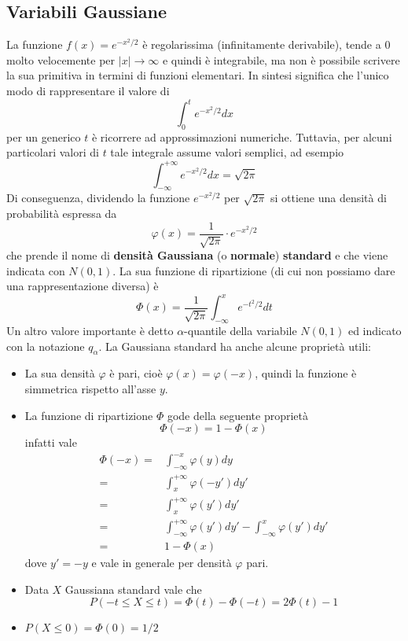 \subsection{Variabili Gaussiane}
La funzione $f(x) = e^{-x^2 / 2}$ è regolarissima (infinitamente derivabile), tende a 0 molto
velocemente per $|x| \to \infty$ e quindi è integrabile, ma non è possibile scrivere la sua
primitiva in termini di funzioni elementari. In sintesi significa che l'unico modo di rappresentare
il valore di
\[ \int_0^t e^{-x^2 / 2} dx \]
per un generico $t$ è ricorrere ad approssimazioni numeriche. Tuttavia, per alcuni particolari
valori di $t$ tale integrale assume valori semplici, ad esempio
\[ \int_{-\infty}^{+\infty} e^{-x^2 / 2} dx = \sqrt{2 \pi} \]
Di conseguenza, dividendo la funzione $e^{-x^2/2}$ per $\sqrt{2 \pi}$ si ottiene una densità di
probabilità espressa da
\[ \varphi (x) = \frac{1}{\sqrt{2 \pi}} \cdot e^{-x^2 / 2} \]
che prende il nome di \textbf{densità Gaussiana} (o \textbf{normale}) \textbf{standard} e che viene
indicata con $N(0,1)$. La sua funzione di ripartizione (di cui non possiamo dare una
rappresentazione diversa) è
\[ \Phi(x) = \frac{1}{\sqrt{2 \pi}} \int_{-\infty}^x e^{-t^2 / 2} dt \]
Un altro valore importante è detto $\alpha$-quantile della variabile $N(0,1)$ ed indicato con la
notazione $q_\alpha$. La Gaussiana standard ha anche alcune proprietà utili:
\begin{itemize}
	\item La sua densità $\varphi$ è pari, cioè $\varphi(x) = \varphi(-x)$, quindi la funzione è
	      simmetrica rispetto all'asse $y$.
	\item La funzione di ripartizione $\Phi$ gode della seguente proprietà
	      \[ \Phi(-x) = 1 - \Phi(x) \]
	      infatti vale
	      \begin{align*}
		      \Phi(-x) = & \int_{-\infty}^{-x} \varphi(y) dy           \\
		      =          & \int_x^{+\infty} \varphi(-y') dy'           \\
		      =          & \int_x^{+\infty} \varphi(y') dy'            \\
		      =          & \int_{-\infty}^{+\infty} \varphi (y') dy' -
		      \int_{-\infty}^x \varphi (y') dy'                        \\
		      =          & 1 - \Phi(x)
	      \end{align*}
	      dove $y' = -y$ e vale in generale per densità $\varphi$ pari.
	\item Data $X$ Gaussiana standard vale che
	      \[ P(-t \leq X \leq t) = \Phi (t) - \Phi (-t) = 2 \Phi (t) - 1 \]
	\item $P(X \leq 0) = \Phi (0) = 1 / 2$
\end{itemize}
